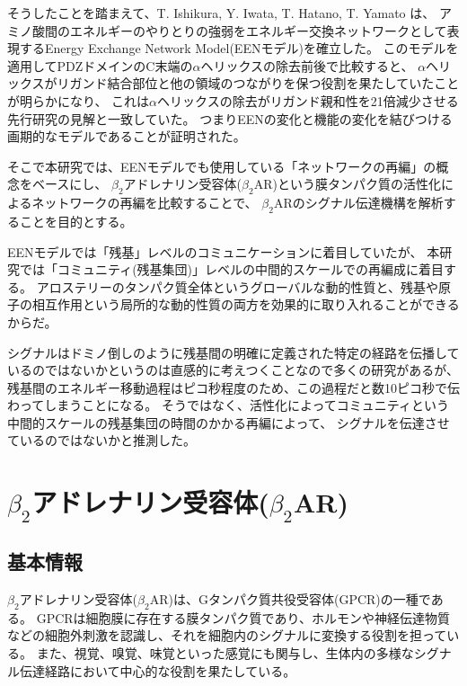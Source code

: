 そうしたことを踏まえて、T. Ishikura, Y. Iwata, T. Hatano, T. Yamato は、
アミノ酸間のエネルギーのやりとりの強弱をエネルギー交換ネットワークとして表現するEnergy Exchange Network Model(EENモデル)を確立\cite{Ishikura2015}した。
このモデルを適用してPDZドメインのC末端の$\alpha$ヘリックスの除去前後で比較すると、
$\alpha$ヘリックスがリガンド結合部位と他の領域のつながりを保つ役割を果たしていたことが明らかになり、
これは$\alpha$ヘリックスの除去がリガンド親和性を21倍減少させる先行研究の見解と一致していた。
つまりEENの変化と機能の変化を結びつける画期的なモデルであることが証明された。


そこで本研究では、EENモデルでも使用している「ネットワークの再編」の概念をベースにし、
$\beta_2$アドレナリン受容体($\beta_2$AR)という膜タンパク質の活性化によるネットワークの再編を比較することで、
$\beta_2$ARのシグナル伝達機構を解析することを目的とする。

EENモデルでは「残基」レベルのコミュニケーションに着目していたが、
本研究では「コミュニティ(残基集団)」レベルの中間的スケールでの再編成に着目する。
アロステリーのタンパク質全体というグローバルな動的性質と、残基や原子の相互作用という局所的な動的性質の両方を効果的に取り入れることができるからだ。

シグナルはドミノ倒しのように残基間の明確に定義された特定の経路を伝播しているのではないかというのは直感的に考えつくことなので多くの研究があるが、
残基間のエネルギー移動過程はピコ秒程度のため、この過程だと数10ピコ秒で伝わってしまうことになる。
そうではなく、活性化によってコミュニティという中間的スケールの残基集団の時間のかかる再編によって、
シグナルを伝達させているのではないかと推測した。


\section{$\beta_2$アドレナリン受容体($\beta_2$AR)}
\label{sec:b2ar}

\subsection{基本情報}
$\beta_2$アドレナリン受容体($\beta_2$AR)は、Gタンパク質共役受容体(GPCR)の一種である。
GPCRは細胞膜に存在する膜タンパク質であり、ホルモンや神経伝達物質などの細胞外刺激を認識し、それを細胞内のシグナルに変換する役割を担っている。
また、視覚、嗅覚、味覚といった感覚にも関与し、生体内の多様なシグナル伝達経路において中心的な役割を果たしている。

